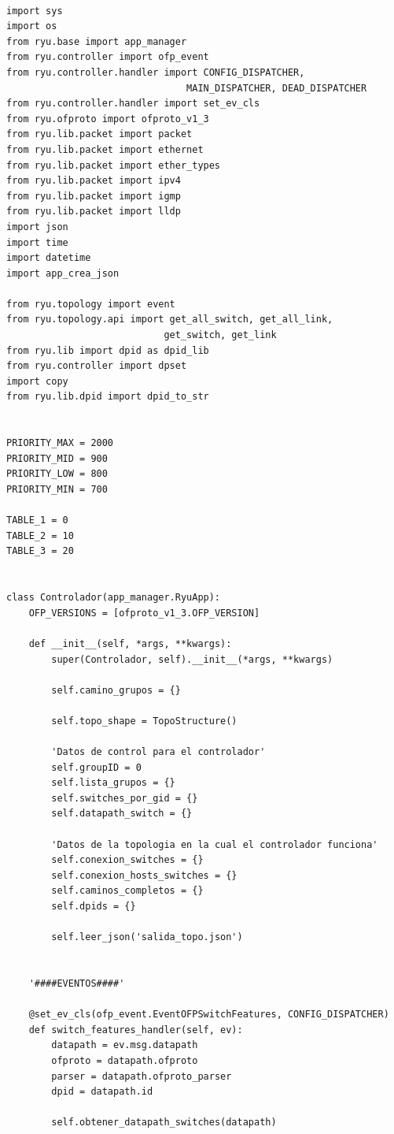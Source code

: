 \documentclass[12pt,a4paper,oneside]{book}
\begin{document}
\begin{lstlisting}[style=codigobase,  label = cod_correrP, caption= controlador.py]

import sys
import os
from ryu.base import app_manager
from ryu.controller import ofp_event
from ryu.controller.handler import CONFIG_DISPATCHER, 
								MAIN_DISPATCHER, DEAD_DISPATCHER
from ryu.controller.handler import set_ev_cls
from ryu.ofproto import ofproto_v1_3
from ryu.lib.packet import packet
from ryu.lib.packet import ethernet
from ryu.lib.packet import ether_types
from ryu.lib.packet import ipv4
from ryu.lib.packet import igmp
from ryu.lib.packet import lldp
import json
import time
import datetime
import app_crea_json

from ryu.topology import event
from ryu.topology.api import get_all_switch, get_all_link, 
							get_switch, get_link
from ryu.lib import dpid as dpid_lib
from ryu.controller import dpset
import copy
from ryu.lib.dpid import dpid_to_str


PRIORITY_MAX = 2000
PRIORITY_MID = 900
PRIORITY_LOW = 800
PRIORITY_MIN = 700

TABLE_1 = 0
TABLE_2 = 10
TABLE_3 = 20


class Controlador(app_manager.RyuApp):
    OFP_VERSIONS = [ofproto_v1_3.OFP_VERSION]

    def __init__(self, *args, **kwargs):
        super(Controlador, self).__init__(*args, **kwargs)

        self.camino_grupos = {}

        self.topo_shape = TopoStructure()

        'Datos de control para el controlador'
        self.groupID = 0
        self.lista_grupos = {}
        self.switches_por_gid = {}
        self.datapath_switch = {}

        'Datos de la topologia en la cual el controlador funciona'
        self.conexion_switches = {}
        self.conexion_hosts_switches = {}
        self.caminos_completos = {}
        self.dpids = {}

        self.leer_json('salida_topo.json')


    '####EVENTOS####'

    @set_ev_cls(ofp_event.EventOFPSwitchFeatures, CONFIG_DISPATCHER)
    def switch_features_handler(self, ev):
        datapath = ev.msg.datapath
        ofproto = datapath.ofproto
        parser = datapath.ofproto_parser
        dpid = datapath.id

        self.obtener_datapath_switches(datapath)


\end{lstlisting}
\end{document}
